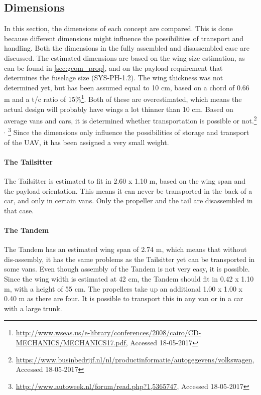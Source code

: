 \subsection{Dimensions}
In this section, the dimensions of each concept are compared. This is done because different dimensions might influence the possibilities of transport and handling. Both the dimensions in the fully assembled and disassembled case are discussed. The estimated dimensions are based on the wing size estimation, as can be found in \autoref{sec:geom_prop}, and on the payload requirement that determines the fuselage size (SYS-PH-1.2). The wing thickness was not determined yet, but has been assumed equal to 10 cm, based on a chord of 0.66 m and a t/c ratio of 15\%\footnote{\url{http://www.wseas.us/e-library/conferences/2008/cairo/CD-MECHANICS/MECHANICS17.pdf}, Accessed 18-05-2017}. Both of these are overestimated, which means the actual design will probably have wings a lot thinner than 10 cm. 
Based on average vans and cars, it is determined whether transportation is possible or not.\footnote{\url{https://www.businbedrijf.nl/nl/productinformatie/autogegevens/volkswagen}, Accessed 18-05-2017}$^{,}$ \footnote{\url{http://www.autoweek.nl/forum/read.php?1,5365747}, Accessed 18-05-2017} Since the dimensions only influence the possibilities of storage and transport of the UAV, it has been assigned a very small weight.



\paragraph{The Tailsitter}
The Tailsitter is estimated to fit in 2.60 x 1.10 m, based on the wing span and the payload orientation. This means it can never be transported in the back of a car, and only in certain vans. Only the propeller and the tail are disassembled in that case.

\paragraph{The Tandem}
The Tandem has an estimated wing span of 2.74 m, which means that without dis-assembly, it has the same problems as the Tailsitter yet can be transported in some vans. Even though assembly of the Tandem is not very easy, it is possible. Since the wing width is estimated at 42 cm, the Tandem should fit in 0.42 x 1.10 m, with a height of 55 cm. The propellers take up an additional 1.00 x 1.00 x 0.40 m as there are four. It is possible to transport this in any van or in a car with a large trunk. 

